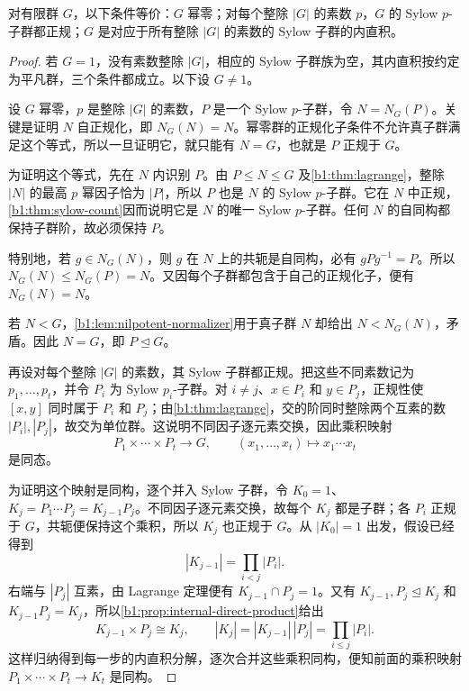 \begin{theorem}\label{b1:thm:finite-nilpotent-sylow}
	对有限群 \(G\)，以下条件等价：\(G\) 幂零；对每个整除 \(|G|\) 的素数 \(p\)，\(G\) 的 Sylow \(p\)-子群都正规；\(G\) 是对应于所有整除 \(|G|\) 的素数的 Sylow 子群的内直积。
\end{theorem}
\begin{proof}
	若 \(G=1\)，没有素数整除 \(|G|\)，相应的 Sylow 子群族为空，其内直积按约定为平凡群，三个条件都成立。以下设 \(G\ne1\)。

	设 \(G\) 幂零，\(p\) 是整除 \(|G|\) 的素数，\(P\) 是一个 Sylow \(p\)-子群，令 \(N=N_G(P)\)。关键是证明 \(N\) 自正规化，即 \(N_G(N)=N\)。幂零群的正规化子条件不允许真子群满足这个等式，所以一旦证明它，就只能有 \(N=G\)，也就是 \(P\) 正规于 \(G\)。

	为证明这个等式，先在 \(N\) 内识别 \(P\)。由 \(P\le N\le G\) 及\cref{b1:thm:lagrange}，整除 \(|N|\) 的最高 \(p\) 幂因子恰为 \(|P|\)，所以 \(P\) 也是 \(N\) 的 Sylow \(p\)-子群。它在 \(N\) 中正规，\cref{b1:thm:sylow-count}因而说明它是 \(N\) 的唯一 Sylow \(p\)-子群。任何 \(N\) 的自同构都保持子群阶，故必须保持 \(P\)。

	特别地，若 \(g\in N_G(N)\)，则 \(g\) 在 \(N\) 上的共轭是自同构，必有 \(gPg^{-1}=P\)。所以 \(N_G(N)\le N_G(P)=N\)。又因每个子群都包含于自己的正规化子，便有 \(N_G(N)=N\)。

	若 \(N<G\)，\cref{b1:lem:nilpotent-normalizer}用于真子群 \(N\) 却给出 \(N<N_G(N)\)，矛盾。因此 \(N=G\)，即 \(P\trianglelefteq G\)。

	再设对每个整除 \(|G|\) 的素数，其 Sylow 子群都正规。把这些不同素数记为 \(p_1,\ldots,p_t\)，并令 \(P_i\) 为 Sylow \(p_i\)-子群。对 \(i\ne j\)、\(x\in P_i\) 和 \(y\in P_j\)，正规性使 \([x,y]\) 同时属于 \(P_i\) 和 \(P_j\)；由\cref{b1:thm:lagrange}，交的阶同时整除两个互素的数 \(|P_i|,|P_j|\)，故交为单位群。这说明不同因子逐元素交换，因此乘积映射
	\[
		P_1\times\cdots\times P_t\longrightarrow G, \qquad (x_1,\ldots,x_t)\longmapsto x_1\cdots x_t
	\]
	是同态。

	为证明这个映射是同构，逐个并入 Sylow 子群，令 \(K_0=1\)、\(K_j=P_1\cdots P_j=K_{j-1}P_j\)。不同因子逐元素交换，故每个 \(K_j\) 都是子群；各 \(P_i\) 正规于 \(G\)，共轭便保持这个乘积，所以 \(K_j\) 也正规于 \(G\)。从 \(|K_0|=1\) 出发，假设已经得到
	\[
		|K_{j-1}|=\prod_{i<j}|P_i|.
	\]
	右端与 \(|P_j|\) 互素，由 Lagrange 定理便有 \(K_{j-1}\cap P_j=1\)。又有 \(K_{j-1},P_j\trianglelefteq K_j\) 和 \(K_{j-1}P_j=K_j\)，所以\cref{b1:prop:internal-direct-product}给出
	\[
		K_{j-1}\times P_j\cong K_j,\qquad |K_j|=|K_{j-1}|\,|P_j|=\prod_{i\le j}|P_i|.
	\]
	这样归纳得到每一步的内直积分解，逐次合并这些乘积同构，便知前面的乘积映射 \(P_1\times\cdots\times P_t\rightarrow K_t\) 是同构。


\end{proof}

